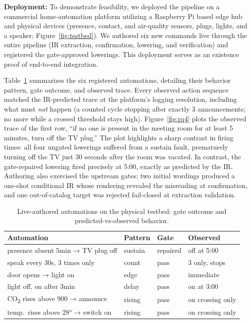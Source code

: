 \documentclass[sigconf,nonacm,anonymous,review]{acmart}
\begin{document}
\textbf{Deployment:} To demonstrate feasibility, we deployed the pipe\-line on a commercial home-automation platform utilizing a Raspberry Pi based edge hub and physical devices (presence, contact, and air-quality sensors, plugs, lights, and a speaker; Figure~\ref{fig:testbed}). We authored six new commands live through the entire pipeline (IR extraction, confirmation, lowering, and verification) and registered the gate-approved lowerings. This deployment serves as an existence proof of end-to-end integration. %

Table~\ref{tab:deploy} summarizes the six registered automations, detailing their behavior pattern, gate outcome, and observed trace. Every observed action sequence matched the IR-predicted trace at the platform's logging resolution, including what must \emph{not} happen (a counted cycle stopping after exactly 3 announcements; no more while a crossed threshold stays high). Figure~\ref{fig:rq4} plots the observed trace of the first row, ``if no one is present in the meeting room for at least 5 minutes, turn off the TV plug.'' 
The plot highlights a sharp contrast in firing times: all four ungated lowerings suffered from a sustain fault, prematurely turning off the TV just 30 seconds after the room was vacated. In contrast, the gate-repaired lowering fired precisely at 5:00, exactly as predicted by the IR.
Authoring also exercised the upstream gates: two initial wordings produced a one-shot conditional IR whose rendering revealed the misreading at confirmation, and one out-of-catalog target was rejected fail-closed at extraction validation.

\begin{table}[t]
\centering
\caption{Live-authored automations on the physical testbed: gate outcome and predicted-vs-observed behavior.}
\label{tab:deploy}
\small
\setlength{\tabcolsep}{2.5pt}
\begin{tabular}{llll}
\toprule
Automation & Pattern & Gate & Observed \\
\midrule
presence absent 5min → TV plug off & sustain & repaired & off at 5:00 \\
speak every 30s, 3 times only & count & pass & 3 only, stops \\
door opens → light on & edge & pass & immediate \\
light off, on after 3min & delay & pass & on at 3:00 \\
CO\textsubscript{2} rises above 900 → announce & rising & pass & on crossing only \\
temp.\ rises above 28° → switch on & rising & pass & on crossing only \\
\bottomrule
\end{tabular}
\end{table}
\end{document}
